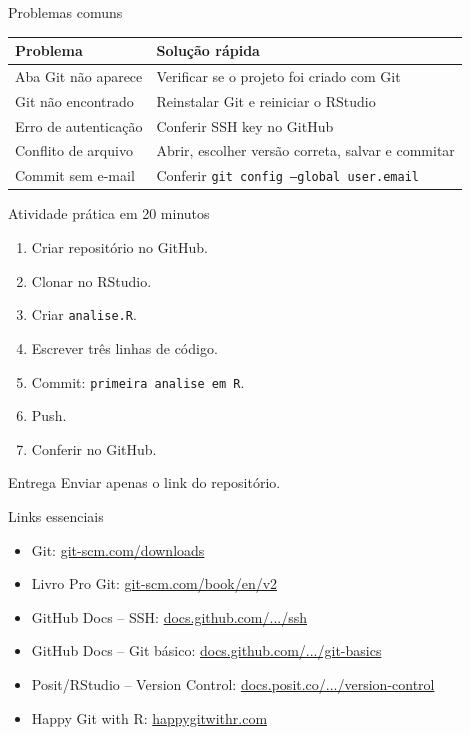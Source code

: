 \documentclass[10pt,aspectratio=169]{beamer}
\begin{document}
\begin{frame}{Problemas comuns}
\large
\begin{tabular}{@{}p{}p{}@{}}
\toprule
\textbf{Problema} & \textbf{Solução rápida} \\
\midrule
Aba Git não aparece & Verificar se o projeto foi criado com Git \\
Git não encontrado & Reinstalar Git e reiniciar o RStudio \\
Erro de autenticação & Conferir SSH key no GitHub \\
Conflito de arquivo & Abrir, escolher versão correta, salvar e commitar \\
Commit sem e-mail & Conferir \texttt{git config --global user.email} \\
\bottomrule
\end{tabular}
\end{frame}

\begin{frame}{Atividade prática em 20 minutos}
\large
\begin{enumerate}
  \item Criar repositório no GitHub.
  \item Clonar no RStudio.
  \item Criar \texttt{analise.R}.
  \item Escrever três linhas de código.
  \item Commit: \texttt{primeira analise em R}.
  \item Push.
  \item Conferir no GitHub.
\end{enumerate}

\vspace{0.35cm}
\begin{block}{Entrega}
Enviar apenas o link do repositório.
\end{block}
\end{frame}

\begin{frame}{Links essenciais}
\large
\begin{itemize}
  \item Git: \href{https://git-scm.com/downloads}{git-scm.com/downloads}
  \item Livro Pro Git: \href{https://git-scm.com/book/en/v2}{git-scm.com/book/en/v2}
  \item GitHub Docs -- SSH: \href{https://docs.github.com/en/authentication/connecting-to-github-with-ssh}{docs.github.com/.../ssh}
  \item GitHub Docs -- Git básico: \href{https://docs.github.com/en/get-started/git-basics}{docs.github.com/.../git-basics}
  \item Posit/RStudio -- Version Control: \href{https://docs.posit.co/ide/user/ide/guide/tools/version-control.html}{docs.posit.co/.../version-control}
  \item Happy Git with R: \href{https://happygitwithr.com/}{happygitwithr.com}
\end{itemize}
\end{frame}
\end{document}
